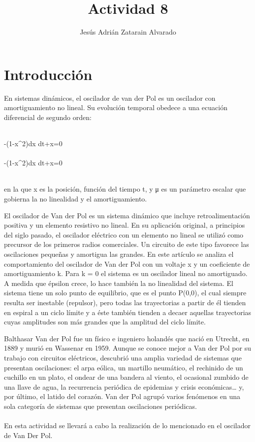 \documentclass{article}
\title{Actividad 8}
\author{Jesús Adrián Zatarain Alvarado}
\begin{document}
\maketitle

\section{Introducción}

En sistemas dinámicos, el oscilador de van der Pol es un oscilador con amortiguamiento no lineal. Su evolución temporal obedece a una ecuación diferencial de segundo orden:
\\
\\
\begin{center}
{-\mu (1-x^{2}){dx \over dt}+x=0} 
\\
\\
{-\mu (1-x^{2}){dx \over dt}+x=0}
\\
\\
\end{center}
en la que x es la posición, función del tiempo t, y μ es un parámetro escalar que gobierna la no linealidad y el amortiguamiento.

El oscilador de Van der Pol es un sistema dinámico que incluye retroalimentación positiva
y un elemento resistivo no lineal. En su aplicación original, a principios del siglo
pasado, el oscilador eléctrico con un elemento no lineal se utilizó como precursor de los
primeros radios comerciales. Un circuito de este tipo favorece las oscilaciones pequeñas
y amortigua las grandes. En este artículo se analiza el comportamiento del oscilador de
Van der Pol con un voltaje x y un coeficiente de amortiguamiento k. Para k = 0 el sistema
es un oscilador lineal no amortiguado. A medida que épsilon crece, lo hace también la
no linealidad del sistema. El sistema tiene un solo punto de equilibrio, que es el punto
P(0,0), el cual siempre resulta ser inestable (repulsor), pero todas las trayectorias a partir
de él tienden en espiral a un ciclo límite y a éste también tienden a decaer aquellas trayectorias
cuyas amplitudes son más grandes que la amplitud del ciclo límite.

Balthasar Van der Pol fue un físico e ingeniero holandés que nació en Utrecht, en 1889 y murió en Wassenar en 1959. Aunque se conoce mejor a Van der Pol por su trabajo con circuitos eléctricos, descubrió una amplia variedad de sistemas que
presentan oscilaciones: el arpa eólica, un martillo neumático, el rechinido de un cuchillo en un plato, el ondear de una bandera al viento, el ocasional zumbido de una llave de agua, la recurrencia periódica de epidemias y crisis económicas… y,
por último, el latido del corazón. Van der Pol agrupó varios fenómenos en una sola categoría de sistemas que presentan oscilaciones periódicas.
\\
\\
En esta actividad se llevará a cabo la realización de lo mencionado en el oscilador de Van Der Pol.
\end{document}
